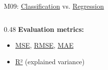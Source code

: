 \documentclass[aspectratio=169, 10pt]{beamer}
\begin{document}
\begin{frame}{M09: \href{https://en.wikipedia.org/wiki/Statistical_classification}{Classification} vs. \href{https://en.wikipedia.org/wiki/Regression_analysis}{Regression}}
\begin{columns}
\begin{column}{0.48\textwidth}
            \vspace{2mm}
            \textbf{Evaluation metrics:}
            \footnotesize
            \begin{itemize}
                \item \href{https://en.wikipedia.org/wiki/Mean_squared_error}{MSE}, \href{https://en.wikipedia.org/wiki/Root-mean-square_deviation}{RMSE}, \href{https://en.wikipedia.org/wiki/Mean_absolute_error}{MAE}
                \item \href{https://en.wikipedia.org/wiki/Coefficient_of_determination}{R²} (explained variance)
            \end{itemize}
        \end{column}
    \end{columns}

\end{frame}
\end{document}
